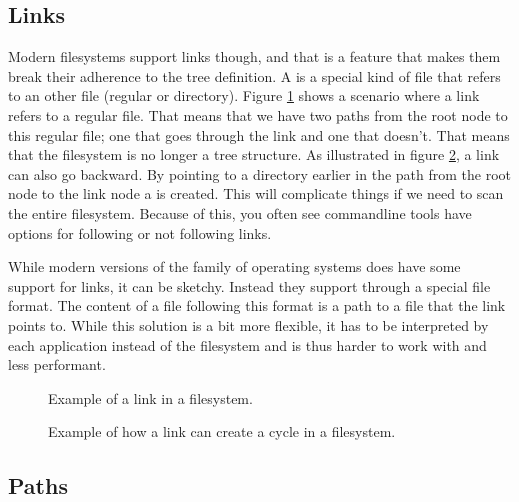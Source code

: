 \subsection{Links}

Modern filesystems support links though, and that is a feature that makes them break their adherence to the tree definition. A  is a special kind of file that refers to an other file (regular or directory). Figure \ref{fig:bs:fs:links} shows a scenario where a link refers to a regular file. That means that we have two paths from the root node to this regular file; one that goes through the link and one that doesn't. That means that the filesystem is no longer a tree structure. As illustrated in figure \ref{fig:bs:fs:cycles}, a link can also go backward. By pointing to a directory earlier in the path from the root node to the link node a  is created. This will complicate things if we need to scan the entire filesystem. Because of this, you often see commandline tools have options for following or not following links.

While modern versions of the  family of operating systems does have some support for links, it can be sketchy. Instead they support  through a special  file format. The content of a file following this format is a path to a file that the link points to. While this solution is a bit more flexible, it has to be interpreted by each application instead of the filesystem and is thus harder to work with and less performant.

\begin{figure}[tbp]
  
  \caption{Example of a link in a filesystem.}
  \label{fig:bs:fs:links}
\end{figure}

\begin{figure}[tbp]
  
  \caption{Example of how a link can create a cycle in a filesystem.}
  \label{fig:bs:fs:cycles}
\end{figure}

\subsection{Paths}
\label{bg:fs:paths}

